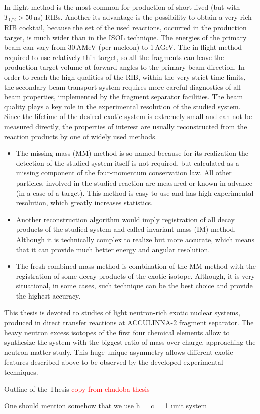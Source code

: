 In-flight method is the most common for production of short lived (but with $T_{1/2}>50\,$ns) RIBs. 
Another its advantage is the possibility to obtain a very rich RIB cocktail, because the set of the used reactions, occurred in the production target, is much wider than in the ISOL technique. 
The energies of the primary beam can vary from 30\,AMeV (per nucleon) to 1\,AGeV.
The in-flight method required to use relatively thin target, so all the fragments can leave the production target volume at forward angles to the primary beam direction. 
In order to reach the high qualities of the RIB, within the very strict time limits, the secondary beam transport system requires more careful diagnostics of all beam properties, implemented by the fragment separator facilities.
The beam quality plays a key role in the experimental resolution of the studied system.
Since the lifetime of the desired exotic system is extremely small and can not be measured directly, the properties of interest are usually reconstructed from the reaction products by one of widely used methods.
\begin{itemize}
	\item 
	The missing-mass (MM) method is so named because for its realization the detection of the studied system itself is not required, but calculated as a missing component of the four-momentum conservation law.
	All other particles, involved in the studied reaction are measured or known in advance (in a case of a target). 
	This method is easy to use and has high experimental resolution, which greatly increases statistics.

	\item 
	Another reconstruction algorithm would imply registration of all decay products of the studied system and called invariant-mass (IM) method.
	Although it is technically complex to realize but more accurate, which means that it can provide much better energy and angular resolution.
	
	\item 
	The fresh combined-mass method is combination of the MM method with the registration of some decay products of the exotic isotope.
	Although, it is very situational, in some cases, such technique can be the best choice and provide the highest accuracy. 
	 
	 
\end{itemize}	


This thesis is devoted to studies of light neutron-rich exotic nuclear systems, produced in direct transfer reactions at ACCULINNA-2 fragment separator.
The heavy neutron excess isotopes of the first four chemical elements allow to synthesize the system with the biggest ratio of mass over charge, approaching the neutron matter study.
This huge unique asymmetry allows different exotic features described above to be observed by the developed experimental techniques.

Outline of the Thesis
\textcolor{red}{copy from chudoba thesis}

One should mention somehow that we use h==c==1 unit system










